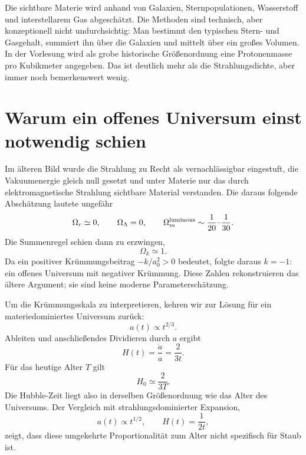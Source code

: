 Die sichtbare Materie wird anhand von Galaxien, Sternpopulationen, Wasserstoff und interstellarem Gas abgeschätzt. Die Methoden sind technisch, aber konzeptionell nicht undurchsichtig: Man bestimmt den typischen Stern- und Gasgehalt, summiert ihn über die Galaxien und mittelt über ein großes Volumen. In der Vorlesung wird als grobe historische Größenordnung eine Protonenmasse pro Kubikmeter angegeben. Das ist deutlich mehr als die Strahlungsdichte, aber immer noch bemerkenswert wenig.

\begin{classroomqa}
\end{classroomqa}

\section{Warum ein offenes Universum einst notwendig schien}

Im älteren Bild wurde die Strahlung zu Recht als vernachlässigbar eingestuft, die Vakuumenergie gleich null gesetzt und unter Materie nur das durch elektromagnetische Strahlung sichtbare Material verstanden. Die daraus folgende Abschätzung lautete ungefähr
\begin{equation}
\Omega_r\simeq0,
\qquad
\Omega_\Lambda=0,
\qquad
\Omega_m^{\rm luminous}\sim\frac{1}{20}\text{--}\frac{1}{30}.
\end{equation}
Die Summenregel schien dann zu erzwingen,
\begin{equation}
\Omega_k\simeq1.
\end{equation}
Da ein positiver Krümmungsbeitrag \(-k/a_0^2>0\) bedeutet, folgte daraus \(k=-1\): ein offenes Universum mit negativer Krümmung. Diese Zahlen rekonstruieren das ältere Argument; sie sind keine moderne Parameterschätzung.

Um die Krümmungsskala zu interpretieren, kehren wir zur Lösung für ein materiedominiertes Universum zurück:
\begin{equation}
a(t)\propto t^{2/3}.
\end{equation}
Ableiten und anschließendes Dividieren durch \(a\) ergibt
\begin{equation}
H(t)=\frac{\dot a}{a}=\frac{2}{3t}.
\label{eq:c06-matter-h}
\end{equation}
Für das heutige Alter \(T\) gilt
\begin{equation}
H_0\simeq\frac{2}{3T}.
\end{equation}
Die Hubble-Zeit liegt also in derselben Größenordnung wie das Alter des Universums. Der Vergleich mit strahlungsdominierter Expansion,
\begin{equation}
a(t)\propto t^{1/2},
\qquad
H(t)=\frac{1}{2t},
\end{equation}
zeigt, dass diese umgekehrte Proportionalität zum Alter nicht spezifisch für Staub ist.

